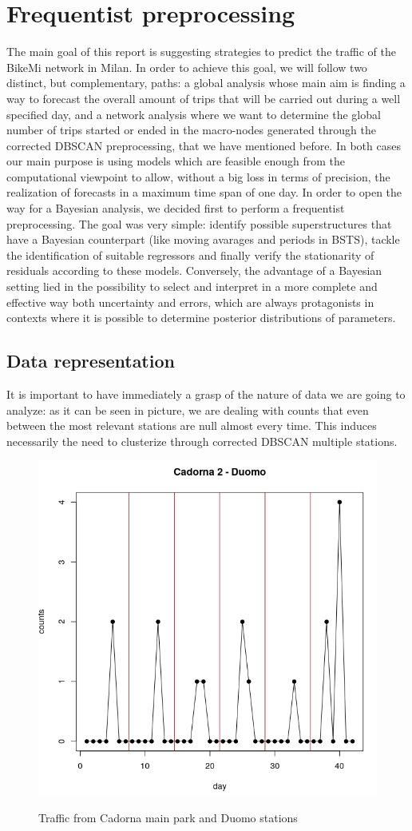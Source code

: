 \documentclass[11pt,twoside]{report}
\begin{document}
\chapter{Frequentist preprocessing}
The main goal of this report is suggesting strategies to predict the traffic of the BikeMi network in Milan. In order to achieve this goal, we will follow two distinct, but complementary, paths: a global analysis whose main aim is finding a way to forecast the overall amount of trips that will be carried out during a well specified day, and a network analysis where we want to determine the global number of trips started or ended in the macro-nodes generated through the corrected DBSCAN preprocessing, that we have mentioned before. In both cases our main purpose is using models which are feasible enough from the computational viewpoint to allow, without a big loss in terms of precision, the realization of forecasts in a maximum time span of one day. In order to open the way for a Bayesian analysis, we decided first to perform a frequentist preprocessing. The goal was very simple: identify possible superstructures that have a Bayesian counterpart (like moving avarages and periods in BSTS), tackle the identification of suitable regressors and finally verify the stationarity of residuals according to these models. Conversely, the advantage of a Bayesian setting lied in the possibility to select and interpret in a more complete and effective way both uncertainty and errors, which are always protagonists in contexts where it is possible to determine posterior distributions of parameters.

\section{Data representation}
It is important to have immediately a grasp of the nature of data we are going to analyze: as it can be seen in picture, we are dealing with counts that even between the most relevant stations are null almost every time. This induces necessarily the need to clusterize through corrected DBSCAN multiple stations.

\begin{figure}[H]
	\centering
	\includegraphics[width=85 mm]{pictures/cadorna_duomo.png}
	\label{fig:cadorna_duomo}
	\caption{Traffic from Cadorna main park and Duomo stations}
\end{figure}
\end{document}
